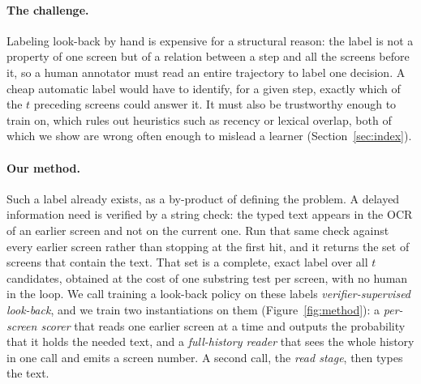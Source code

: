 \paragraph{The challenge.} Labeling look-back by hand is expensive for a structural reason: the label is not a property of one screen but of a relation between a step and all the screens before it, so a human annotator must read an entire trajectory to label one decision. A cheap automatic label would have to identify, for a given step, exactly which of the $t$ preceding screens could answer it. It must also be trustworthy enough to train on, which rules out heuristics such as recency or lexical overlap, both of which we show are wrong often enough to mislead a learner (Section~\ref{sec:index}).

\paragraph{Our method.} Such a label already exists, as a by-product of defining the problem. A delayed information need is verified by a string check: the typed text appears in the OCR of an earlier screen and not on the current one. Run that same check against every earlier screen rather than stopping at the first hit, and it returns the set of screens that contain the text. That set is a complete, exact label over all $t$ candidates, obtained at the cost of one substring test per screen, with no human in the loop. We call training a look-back policy on these labels \emph{verifier-supervised look-back}, and we train two instantiations on them (Figure~\ref{fig:method}): a \emph{per-screen scorer} that reads one earlier screen at a time and outputs the probability that it holds the needed text, and a \emph{full-history reader} that sees the whole history in one call and emits a screen number. A second call, the \emph{read stage}, then types the text.

